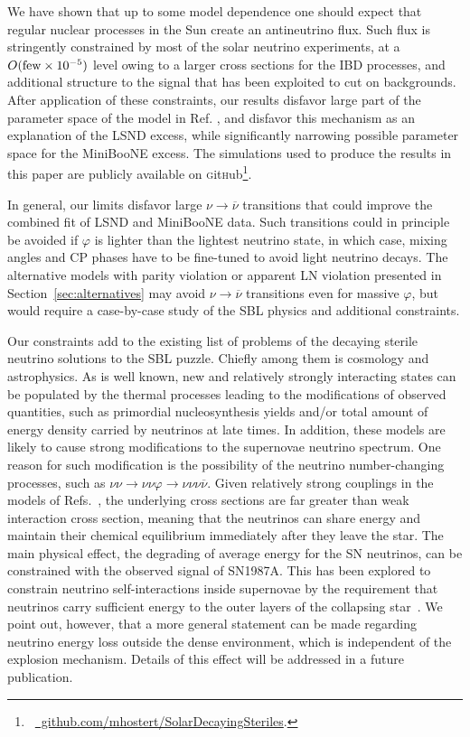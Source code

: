 \documentclass[
reprint,
superscriptaddress,
showpacs,
preprintnumbers,
nofootinbib,
nobibnotes,
amsmath,
amssymb, 
aps,
prd,
floatfix
]{revtex4-1}
\newcommand{\refsec}[1]{Section~\ref{#1}}
\renewcommand{\phi}{\varphi}
\begin{document}
We have shown that up to some model dependence one should expect that regular nuclear processes in the Sun create an antineutrino flux. Such flux is stringently constrained by most of the solar neutrino experiments, at a $O({\rm few}\times 10^{-5})$ level owing to a larger cross sections for the IBD processes, and additional structure to the signal that has been exploited to cut on backgrounds. After application of these constraints, our results disfavor large part of the parameter space of the model in Ref. \cite{Dentler:2019dhz}, and disfavor this mechanism as an explanation of the LSND excess, while significantly narrowing possible parameter space for the MiniBooNE excess. The simulations used to produce the results in this paper are publicly available on \textsc{g}it\textsc{h}ub\footnote{~\href{https://github.com/mhostert/SolarDecayingSteriles}{{\color{blue-violet}\faGithub}\, github.com/mhostert/SolarDecayingSteriles}.}.

In general, our limits disfavor large $\nu\to\overline{\nu}$ transitions that could improve the combined fit of LSND and MiniBooNE data. Such transitions could in principle be avoided if $\phi$ is lighter than the lightest neutrino state, in which case, mixing angles and CP phases have to be fine-tuned to avoid light neutrino decays. The alternative models with parity violation or apparent LN violation presented in \refsec{sec:alternatives} may avoid $\nu\to\overline{\nu}$ transitions even for massive $\phi$, but would require a case-by-case study of the SBL physics and additional constraints. 

Our constraints add to the existing list of problems of the decaying sterile neutrino solutions to the SBL puzzle. Chiefly among them is cosmology and astrophysics. As is well known, new and relatively strongly interacting states can be populated by the thermal processes leading to the modifications of observed quantities, such as primordial nucleosynthesis yields and/or total amount of energy density carried by neutrinos at late times. In addition, these models are likely to cause strong modifications to the supernovae neutrino spectrum. One reason for such modification is the possibility of the neutrino number-changing processes, such as $\nu\nu\to \nu\nu\varphi\to \nu\nu\nu\overline{\nu}$. Given relatively strong couplings in the models of Refs.~\cite{deGouvea:2019qre,Dentler:2019dhz}, the underlying cross sections are far greater than weak interaction cross section, meaning that the neutrinos can share energy and maintain their chemical equilibrium immediately after they leave the star. The main physical effect, the degrading of average energy for the SN neutrinos, can be constrained with the observed signal of SN1987A. This has been explored to constrain neutrino self-interactions inside supernovae by the requirement that neutrinos carry sufficient energy to the outer layers of the collapsing star~\cite{Shalgar:2019rqe}. We point out, however, that a more general statement can be made regarding neutrino energy loss outside the dense environment, which is independent of the explosion mechanism. Details of this effect will be addressed in a future publication.
\end{document}

